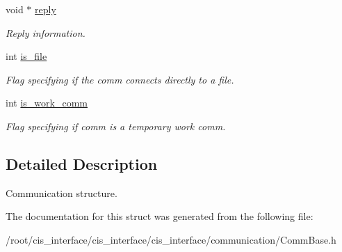 \begin{DoxyCompactItemize}
\mbox{\label{structcomm__t_a05095fa4451ed9085e2d23bb5304df10}} 
void $\ast$ \mbox{\hyperlink{structcomm__t_a05095fa4451ed9085e2d23bb5304df10}{reply}}
\begin{DoxyCompactList}\small\item\em Reply information. \end{DoxyCompactList}\item 
\mbox{\label{structcomm__t_a2d004dd7203d970ac2f398a25276ad2f}} 
int \mbox{\hyperlink{structcomm__t_a2d004dd7203d970ac2f398a25276ad2f}{is\+\_\+file}}
\begin{DoxyCompactList}\small\item\em Flag specifying if the comm connects directly to a file. \end{DoxyCompactList}\item 
\mbox{\label{structcomm__t_a9b44169ff04756e8802bb2510892cf56}} 
int \mbox{\hyperlink{structcomm__t_a9b44169ff04756e8802bb2510892cf56}{is\+\_\+work\+\_\+comm}}
\begin{DoxyCompactList}\small\item\em Flag specifying if comm is a temporary work comm. \end{DoxyCompactList}\end{DoxyCompactItemize}


\subsection{Detailed Description}
Communication structure. 

The documentation for this struct was generated from the following file\+:\begin{DoxyCompactItemize}
\item 
/root/cis\+\_\+interface/cis\+\_\+interface/cis\+\_\+interface/communication/Comm\+Base.\+h\end{DoxyCompactItemize}
